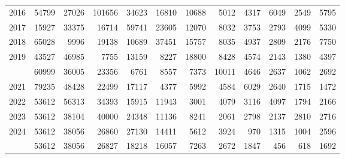 \documentclass[
]{article}
\begin{document}
\begin{longtable}[t]{lrrrrrrrrrrr}
2016 & 54799 & 27026 & 101656 & 34623 & 16810 & 10688 & 5012 & 4317 & 6049 & 2549 & 5795\\
2017 & 15927 & 33375 & 16714 & 59741 & 23605 & 12070 & 8032 & 3753 & 2793 & 4099 & 5330\\
2018 & 65028 & 9996 & 19138 & 10689 & 37451 & 15757 & 8035 & 4937 & 2809 & 2176 & 7750\\
2019 & 43527 & 46985 & 7755 & 13159 & 8227 & 18800 & 8428 & 4574 & 2143 & 1380 & 4397\\
\addlinespace
2020 & 60999 & 36005 & 23356 & 6761 & 8557 & 7373 & 10011 & 4646 & 2637 & 1062 & 2692\\
2021 & 79235 & 48428 & 22499 & 17117 & 4377 & 5992 & 4584 & 6029 & 2640 & 1715 & 1472\\
2022 & 53612 & 56313 & 34393 & 15915 & 11943 & 3001 & 4079 & 3116 & 4097 & 1794 & 2166\\
2023 & 53612 & 38104 & 40000 & 24348 & 11136 & 8241 & 2061 & 2798 & 2137 & 2810 & 2716\\
2024 & 53612 & 38056 & 26860 & 27130 & 14411 & 5612 & 3924 & 970 & 1315 & 1004 & 2596\\
\addlinespace
2025 & 53612 & 38056 & 26827 & 18218 & 16057 & 7263 & 2672 & 1847 & 456 & 618 & 1692\\*
\end{longtable}
\end{document}
